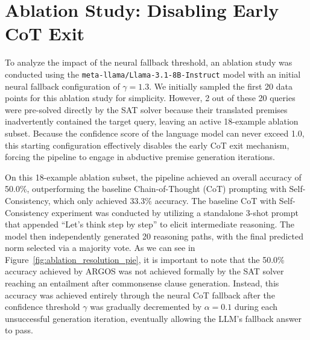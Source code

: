 


\section{Ablation Study: Disabling Early CoT Exit}
\label{sec:ablationStudy}
To analyze the impact of the neural fallback threshold, an ablation study was conducted using the \texttt{meta-llama/Llama-3.1-8B-Instruct} model with an initial neural fallback configuration of $\gamma = 1.3$. We initially sampled the first 20 data points for this ablation study for simplicity. However, 2 out of these 20 queries were pre-solved directly by the SAT solver because their translated premises inadvertently contained the target query, leaving an active 18-example ablation subset. Because the confidence score of the language model can never exceed 1.0, this starting configuration effectively disables the early CoT exit mechanism, forcing the pipeline to engage in abductive premise generation iterations. 

On this 18-example ablation subset, the pipeline achieved an overall accuracy of 50.0\%, outperforming the baseline Chain-of-Thought (CoT) prompting with Self-Consistency, which only achieved 33.3\% accuracy. The baseline CoT with Self-Consistency experiment was conducted by utilizing a standalone 3-shot prompt that appended ``Let's think step by step'' to elicit intermediate reasoning. The model then independently generated 20 reasoning paths, with the final predicted norm selected via a majority vote. As we can see in Figure~\ref{fig:ablation_resolution_pie}, it is important to note that the 50.0\% accuracy achieved by ARGOS was not achieved formally by the SAT solver reaching an entailment after commonsense clause generation. Instead, this accuracy was achieved entirely through the neural CoT fallback after the confidence threshold $\gamma$ was gradually decremented by $\alpha=0.1$ during each unsuccessful generation iteration, eventually allowing the LLM's fallback answer to pass.

